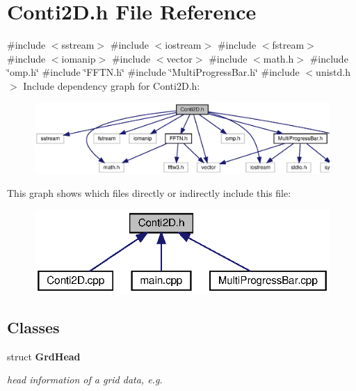 \section{Conti2\+D.\+h File Reference}
\label{Conti2D_8h}
{\ttfamily \#include $<$sstream$>$}\newline
{\ttfamily \#include $<$iostream$>$}\newline
{\ttfamily \#include $<$fstream$>$}\newline
{\ttfamily \#include $<$iomanip$>$}\newline
{\ttfamily \#include $<$vector$>$}\newline
{\ttfamily \#include $<$math.\+h$>$}\newline
{\ttfamily \#include \char`\"{}omp.\+h\char`\"{}}\newline
{\ttfamily \#include \char`\"{}F\+F\+T\+N.\+h\char`\"{}}\newline
{\ttfamily \#include \char`\"{}Multi\+Progress\+Bar.\+h\char`\"{}}\newline
{\ttfamily \#include $<$unistd.\+h$>$}\newline
Include dependency graph for Conti2\+D.\+h\+:\nopagebreak
\begin{figure}[H]
\begin{center}
\leavevmode
\includegraphics[width=350pt]{Conti2D_8h__incl}
\end{center}
\end{figure}
This graph shows which files directly or indirectly include this file\+:\nopagebreak
\begin{figure}[H]
\begin{center}
\leavevmode
\includegraphics[width=319pt]{Conti2D_8h__dep__incl}
\end{center}
\end{figure}
\subsection*{Classes}
\begin{DoxyCompactItemize}
\item 
struct \textbf{ Grd\+Head}
\begin{DoxyCompactList}\small\item\em head information of a grid data, e.\+g. \end{DoxyCompactList}\end{DoxyCompactItemize}
